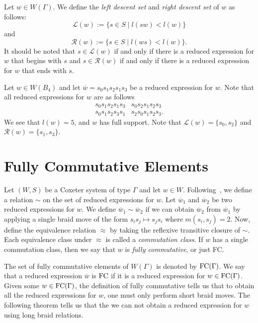 Let $w \in W(\Gamma)$. We define the \emph{left descent set} and \emph{right descent set} of $w$ as follows:
\[\mathcal{L}(w):=\{s \in S \mid l(sw) < l(w)\}\]
and
\[\mathcal{R}(w):=\{s \in S \mid l(ws) < l(w)\}.\]
It should be noted that $s \in \mathcal{L}(w)$ if and only if there is a reduced expression for $w$ that begins with $s$ and $s \in \mathcal{R}(w)$ if and only if there is a reduced expression for $w$ that ends with $s$.

\begin{example}
Let $w \in W(B_4)$ and let $\overline{w}=s_0s_1s_2s_1s_3$ be a reduced expression for $w$. Note that all reduced expressions for $w$ are as follows 
$$\begin{array}{ll}
s_0s_1s_2s_1s_3 & s_0s_2s_1s_2s_3\\
s_0s_1s_2s_3s_1 & s_2s_0s_1s_2s_3.	
\end{array}$$
We see that $l(w)=5$, and $w$ has full support. Note that $\mathcal{L}(w)=\{s_0, s_2\}$ and $\mathcal{R}(w)=\{s_1, s_3\}$.	
\end{example}




\section{Fully Commutative Elements}\label{sec:FC}
Let $(W,S)$ be a Coxeter system of type $\Gamma$ and let $w \in W$. Following~\cite{Stembridge1996}, we define a relation $\sim$ on the set of reduced expressions for $w$. Let $\overline{w}_1$ and $\overline{w}_2$ be two reduced expressions for $w$. We define $\overline{w}_1 \sim \overline{w}_2$ if we can obtain $\overline{w}_2$ from $\overline{w}_1$ by applying a single braid move of the form $s_is_j \mapsto s_js_i$ where $m(s_i,s_j)=2$. Now, define the equivalence relation $\approx$ by taking the reflexive transitive closure of $\sim$. Each equivalence class under $\approx$ is called a \emph{commutation class}. If $w$ has a single commutation class, then we say that $w$ is \emph{fully commutative}, or just FC. 

The set of fully commutative elements of $W(\Gamma)$ is denoted by $\mathrm{FC}(\Gamma)$. We say that a reduced expression $\overline{w}$ is $\mathrm{FC}$ if it is a reduced expression for $w \in \mathrm{FC}(\Gamma)$. Given some $w \in \mathrm{FC}(\Gamma)$, the definition of fully commutative tells us that to obtain all the reduced expressions for $w$, one must only perform short braid moves. The following theorem tells us that the we can not obtain a reduced expression for $w$ using long braid relations.

